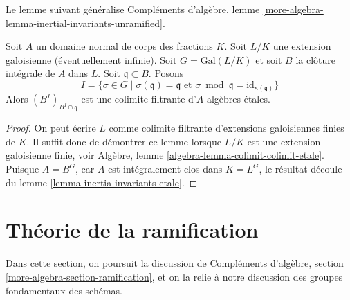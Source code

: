 \noindent
Le lemme suivant généralise
Compléments d'algèbre, lemme \ref{more-algebra-lemma-inertial-invariants-unramified}.

\begin{lemma}
\label{lemma-inertial-invariants-unramified}
Soit $A$ un domaine normal de corps des fractions $K$.
Soit $L/K$ une extension galoisienne (éventuellement infinie).
Soit $G = \text{Gal}(L/K)$ et soit
$B$ la clôture intégrale de $A$ dans $L$.
Soit $\mathfrak q \subset B$. Posons
$$
I = \{\sigma \in G \mid
\sigma(\mathfrak q) = \mathfrak q \text{ et }
\sigma \bmod \mathfrak q = \text{id}_{\kappa(\mathfrak q)}\}
$$
Alors $(B^I)_{B^I \cap \mathfrak q}$ est une colimite filtrante
d'$A$-algèbres étales.
\end{lemma}

\begin{proof}
On peut écrire $L$ comme colimite filtrante d'extensions galoisiennes finies
de $K$. Il suffit donc de démontrer ce lemme lorsque $L/K$ est
une extension galoisienne finie, voir
Algèbre, lemme \ref{algebra-lemma-colimit-colimit-etale}.
Puisque $A = B^G$, car $A$ est intégralement
clos dans $K = L^G$, le résultat découle du
lemme \ref{lemma-inertia-invariants-etale}.
\end{proof}







\section{Théorie de la ramification}
\label{section-ramification}

\noindent
Dans cette section, on poursuit la discussion de
Compléments d'algèbre, section \ref{more-algebra-section-ramification},
et on la relie à notre discussion des groupes fondamentaux des schémas.

